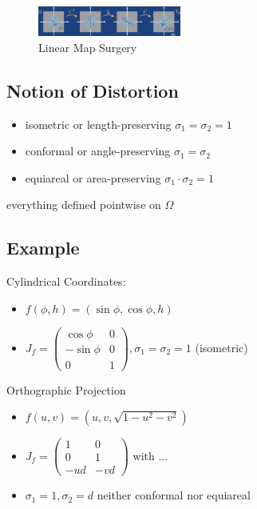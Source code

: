 \begin{figure}[!htb]
    \centering
    \includegraphics[width=0.42\textwidth]{pic/ACG2/Linear Map Surgery}
    \caption{Linear Map Surgery}
\end{figure}

\subsection{Notion of Distortion}
\begin{itemize}
    \item isometric or length-preserving
    \subitem $\sigma_1=\sigma_2=1$
    \item conformal or angle-preserving
    \subitem $\sigma_1=\sigma_2$
    \item equiareal or area-preserving
    \subitem $\sigma_1\cdot\sigma_2=1$
\end{itemize}
everything defined pointwise on $\Omega$

\subsection{Example}
Cylindrical Coordinates:
\begin{itemize}
    \item $f(\phi, h)=(\sin\phi, \cos\phi, h)$
    \item $J_f=\begin{pmatrix}
        \cos\phi & 0 \\ -\sin\phi & 0 \\ 0 & 1
    \end{pmatrix}, \sigma_1=\sigma_2=1$ (isometric)
\end{itemize}

Orthographic Projection
\begin{itemize}
    \item $f(u,v)=(u,v,\sqrt{1-u^2-v^2})$
    \item $J_f=\begin{pmatrix}
        1 & 0 \\ 0 & 1 \\ -ud & -vd 
    \end{pmatrix}$ with ...
    \item $\sigma_1=1, \sigma_2=d$ neither conformal nor equiareal
\end{itemize}

